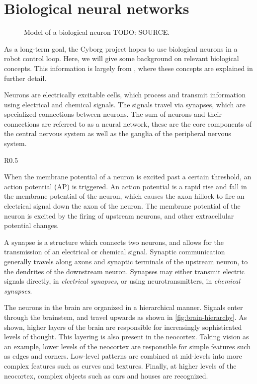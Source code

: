 \documentclass[\rootfolder/main.tex]{subfiles}
\begin{document}
\section{Biological neural networks}

\begin{figure}
    \caption{Model of a biological neuron TODO: SOURCE.\label{fig:biological_neuron}}
\end{figure}

As a long-term goal, the Cyborg project hopes to use biological neurons in a robot control loop.
Here, we will give some background on relevant biological concepts.
This information is largely from \cite{Knudsen2016}, where these concepts are explained in further detail.

Neurons are electrically excitable cells, which process and transmit information using electrical and chemical signals.
The signals travel via synapses, which are specialized connections between neurons.
The sum of neurons and their connections are referred to as a neural network, these are the core components of the central nervous system as well as the ganglia of the peripheral nervous system.

\begin{wrapfigure}{R}{0.5\columnwidth}
    \caption{Model of the hierarcical structure of the brain\cite{Perry1999}.\label{fig:brain-hierarchy}}
\end{wrapfigure}

When the membrane potential of a neuron is excited past a certain threshold, an action potential (AP) is triggered.
An action potential is a rapid rise and fall in the membrane potential of the neuron, which causes the axon hillock to fire an electrical signal down the axon of the neuron.
The membrane potential of the neuron is excited by the firing of upstream neurons, and other extracellular potential changes.

A synapse is a structure which connects two neurons, and allows for the transmission of an electrical or chemical signal.
Synaptic communication generally travels along axons and synaptic terminals of the upstream neuron, to the dendrites of the downstream neuron.
Synapses may either transmit electric signals directly, in \emph{electrical synapses}, or using neurotransmitters, in \emph{chemical synapses}.

The neurons in the brain are organized in a hierarchical manner.
Signals enter through the brainstem, and travel upwards as shown in \cref{fig:brain-hierarchy}.
As shown, higher layers of the brain are responsible for increasingly sophisticated levels of thought.
This layering is also present in the neocortex.
Taking vision as an example, lower levels of the neocortex are responsible for simple features such as edges and corners.
Low-level patterns are combined at mid-levels into more complex features such as curves and textures.
Finally, at higher levels of the neocortex, complex objects such as cars and houses are recognized.
\end{document}
